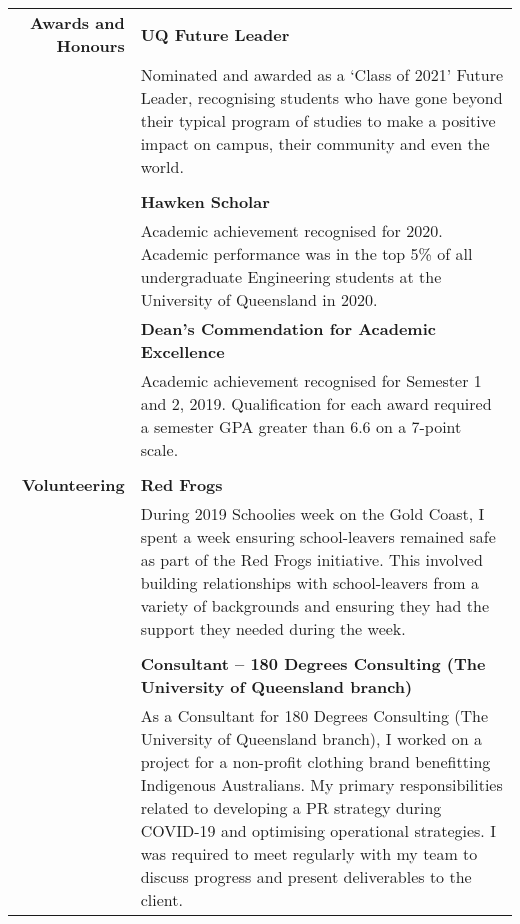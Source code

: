 \documentclass[a4paper]{article}
\begin{document}
\begin{longtable}{r p{13.5cm}}
	\textbf{Awards and Honours}  \vline & \textbf{UQ Future Leader} \\
										\vline & Nominated and awarded as a `Class of 2021' Future Leader, recognising students who have gone beyond their typical program of studies to make a positive impact on campus, their community and even the world. \\
										\vline & \\

										\vline & \textbf{Hawken Scholar} \\
										\vline & Academic achievement recognised for 2020. Academic performance was in the top 5\% of all undergraduate Engineering students at the University of Queensland in 2020. \\
										
										\vline & \textbf{Dean's Commendation for Academic Excellence} \\
										\vline & Academic achievement recognised for Semester 1 and 2, 2019. Qualification for each award required a semester GPA greater than 6.6 on a 7-point scale. \\
										\vline & \\
										
	\textbf{Volunteering} 	\vline & \textbf{Red Frogs} \\
										\vline & During 2019 Schoolies week on the Gold Coast, I spent a week ensuring school-leavers remained safe as part of the Red Frogs initiative. This involved building relationships with school-leavers from a variety of backgrounds and ensuring they had the support they needed during the week. \\
										\vline & \\
										
										\vline & \textbf{Consultant – 180 Degrees Consulting (The University of Queensland branch)} \\
										\vline & As a Consultant for 180 Degrees Consulting (The University of Queensland branch), I worked on a project for a non-profit clothing brand benefitting Indigenous Australians. My primary responsibilities related to developing a PR strategy during COVID-19 and optimising operational strategies. I was required to meet regularly with my team to discuss progress and present deliverables to the client. \\
							     
\end{longtable}
\end{document}

